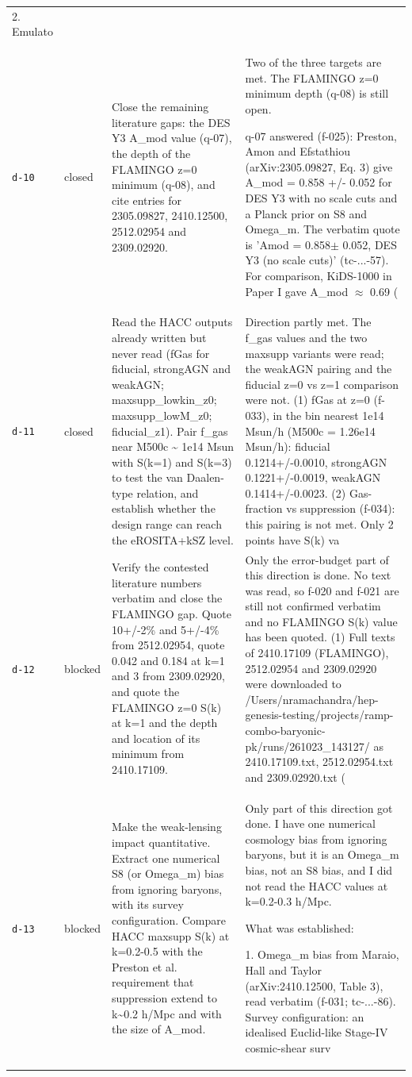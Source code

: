 \documentclass[11pt,a4paper]{article}
\begin{document}
\begin{longtable}{@{}p{}p{}p{}p{}@{}}
2. Emulato \\
\texttt{d-10} & closed & Close the remaining literature gaps: the DES Y3 A\_mod value (q-07), the depth of the FLAMINGO z=0 minimum (q-08), and cite entries for 2305.09827, 2410.12500, 2512.02954 and 2309.02920. & Two of the three targets are met. The FLAMINGO z=0 minimum depth (q-08) is still open.

q-07 answered (f-025): Preston, Amon and Efstathiou (arXiv:2305.09827, Eq. 3) give A\_mod = 0.858 +/- 0.052 for DES Y3 with no scale cuts and a Planck prior on S8 and Omega\_m. The verbatim quote is 'Amod = 0.858$\pm$ 0.052, DES Y3 (no scale cuts)' (tc-...-57). For comparison, KiDS-1000 in Paper I gave A\_mod $\approx$ 0.69 ( \\
\texttt{d-11} & closed & Read the HACC outputs already written but never read (fGas for fiducial, strongAGN and weakAGN; maxsupp\_lowkin\_z0; maxsupp\_lowM\_z0; fiducial\_z1). Pair f\_gas near M500c \textasciitilde{} 1e14 Msun with S(k=1) and S(k=3) to test the van Daalen-type relation, and establish whether the design range can reach the eROSITA+kSZ level. & Direction partly met. The f\_gas values and the two maxsupp variants were read; the weakAGN pairing and the fiducial z=0 vs z=1 comparison were not. (1) fGas at z=0 (f-033), in the bin nearest 1e14 Msun/h (M500c = 1.26e14 Msun/h): fiducial 0.1214+/-0.0010, strongAGN 0.1221+/-0.0019, weakAGN 0.1414+/-0.0023. (2) Gas-fraction vs suppression (f-034): this pairing is not met. Only 2 points have S(k) va \\
\texttt{d-12} & blocked & Verify the contested literature numbers verbatim and close the FLAMINGO gap. Quote 10+/-2\% and 5+/-4\% from 2512.02954, quote 0.042 and 0.184 at k=1 and 3 from 2309.02920, and quote the FLAMINGO z=0 S(k) at k=1 and the depth and location of its minimum from 2410.17109. & Only the error-budget part of this direction is done. No text was read, so f-020 and f-021 are still not confirmed verbatim and no FLAMINGO S(k) value has been quoted. (1) Full texts of 2410.17109 (FLAMINGO), 2512.02954 and 2309.02920 were downloaded to /Users/nramachandra/hep-genesis-testing/projects/ramp-combo-baryonic-pk/runs/261023\_143127/ as 2410.17109.txt, 2512.02954.txt and 2309.02920.txt ( \\
\texttt{d-13} & blocked & Make the weak-lensing impact quantitative. Extract one numerical S8 (or Omega\_m) bias from ignoring baryons, with its survey configuration. Compare HACC maxsupp S(k) at k=0.2-0.5 with the Preston et al. requirement that suppression extend to k\textasciitilde{}0.2 h/Mpc and with the size of A\_mod. & Only part of this direction got done. I have one numerical cosmology bias from ignoring baryons, but it is an Omega\_m bias, not an S8 bias, and I did not read the HACC values at k=0.2-0.3 h/Mpc.

What was established:

1. Omega\_m bias from Maraio, Hall and Taylor (arXiv:2410.12500, Table 3), read verbatim (f-031; tc-...-86). Survey configuration: an idealised Euclid-like Stage-IV cosmic-shear surv \\
\bottomrule\end{longtable}
\end{document}
